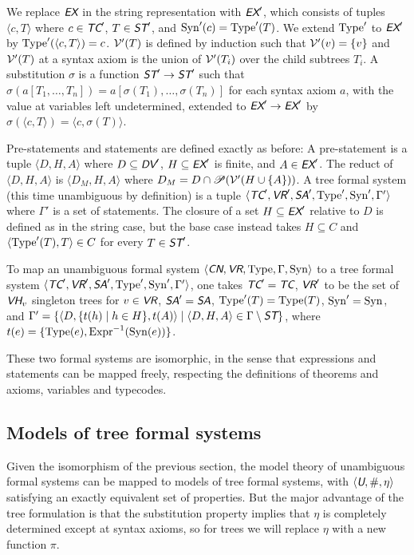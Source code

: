 \documentclass[runningheads,a4paper]{llncs}
\newcommand{\cn}{\textit{\textsf{CN}}} %
\newcommand{\vr}{\textit{\textsf{VR}}} %
\newcommand{\ex}{\textit{\textsf{EX}}} %
\newcommand{\dv}{\textit{\textsf{DV}}} %
\newcommand{\vh}{\textit{\textsf{VH}}} %
\newcommand{\tc}{\textit{\textsf{TC}}} %
\newcommand{\uv}{\textit{\textsf{U}}} %
\newcommand{\sa}{\textit{\textsf{SA}}} %
\newcommand{\st}{\textit{\textsf{ST}}} %
\newcommand{\ang}[1]{\langle#1\rangle}
\newcommand{\type}{{\rm Type}}
\newcommand{\syn}{{\rm Syn}}
\newcommand{\expr}{{\rm Expr}}
\newcommand{\fresh}{\mathbin{\#}}
\newcommand{\pow}[1]{\mathscr{P}(#1)}
\begin{document}
We replace $\ex$ in the string representation with $\ex'$, which consists of tuples $\ang{c,T}$ where $c\in\tc'$, $T\in\st'$, and $\syn'(c)=\type'(T)$. We extend $\type'$ to $\ex'$ by $\type'(\ang{c,T})=c$. ${\cal V}'(T)$ is defined by induction such that ${\cal V}'(v)=\{v\}$ and ${\cal V}'(T)$ at a syntax axiom is the union of ${\cal V}'(T_i)$ over the child subtrees $T_i$. A substitution $\sigma$ is a function $\st'\to\st'$ such that $\sigma(a[T_1,\dots,T_n])=a[\sigma(T_1),\dots,\sigma(T_n)]$ for each syntax axiom $a$, with the value at variables left undetermined, extended to $\ex'\to\ex'$ by $\sigma(\ang{c,T})=\ang{c,\sigma(T)}$.

Pre-statements and statements are defined exactly as before: A pre-statement is a tuple $\ang{D,H,A}$ where $D\subseteq\dv'$, $H\subseteq\ex'$ is finite, and $A\in\ex'$. The reduct of $\ang{D,H,A}$ is $\ang{D_M,H,A}$ where $D_M=D\cap\pow{{\cal V}'(H\cup\{A\})}$. A tree formal system (this time unambiguous by definition) is a tuple $\ang{\tc',\vr',\sa',\type',\syn',\Gamma'}$ where $\Gamma'$ is a set of statements. The closure of a set $H\subseteq\ex'$ relative to $D$ is defined as in the string case, but the base case instead takes $H\subseteq C$ and $\ang{\type'(T),T}\in C$ for every $T\in\st'$.

To map an unambiguous formal system $\ang{\cn,\vr,\type,\Gamma,\syn}$ to a tree formal system $\ang{\tc',\vr',\sa',\type',\syn',\Gamma'}$, one takes $\tc'=\tc$, $\vr'$ to be the set of $\vh_v$ singleton trees for $v\in\vr$, $\sa'=\sa$, $\type'(T)=\type(T)$, $\syn'=\syn$, and $\Gamma'=\{\ang{D,\{t(h)\mid h\in H\},t(A)}\mid\ang{D,H,A}\in\Gamma\setminus\st\}$, where $t(e)=\{\type(e),\expr^{-1}(\syn(e))\}$.

These two formal systems are isomorphic, in the sense that expressions and statements can be mapped freely, respecting the definitions of theorems and axioms, variables and typecodes.

\subsection{Models of tree formal systems}\label{sec:treemodel}
Given the isomorphism of the previous section, the model theory of unambiguous formal systems can be mapped to models of tree formal systems, with $\ang{\uv,\fresh,\eta}$ satisfying an exactly equivalent set of properties. But the major advantage of the tree formulation is that the substitution property implies that $\eta$ is completely determined except at syntax axioms, so for trees we will replace $\eta$ with a new function $\pi$.
\end{document}
